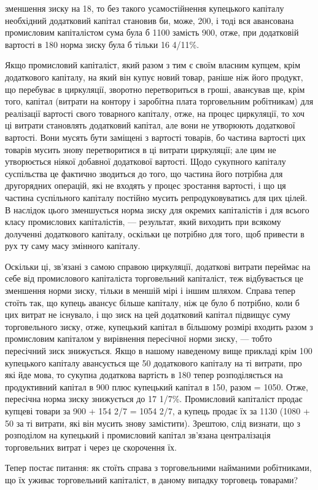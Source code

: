 зменшення зиску на 18, то без такого усамостійнення купецького
капіталу необхідний додатковий капітал становив би, може, 200,
і тоді вся авансована промисловим капіталістом сума була б 1100
замість 900, отже, при додатковій вартості в 180 норма зиску
була б тільки 16 4/11\%.

Якщо промисловий капіталіст, який разом з тим є своїм
власним купцем, крім додаткового капіталу, на який він купує
новий товар, раніше ніж його продукт, що перебуває в циркуляції,
зворотно перетвориться в гроші, авансував ще, крім того,
капітал (витрати на контору і заробітна плата торговельним
робітникам) для реалізації вартості свого товарного капіталу,
отже, на процес циркуляції, то хоч ці витрати становлять
додатковий капітал, але вони не утворюють додаткової вартості.
Вони мусять бути заміщені з вартості товарів, бо частина
вартості цих товарів мусить знову перетворитися в ці витрати
циркуляції; але цим не утворюється ніякої добавної додаткової
вартості. Щодо сукупного капіталу суспільства це фактично
зводиться до того, що частина його потрібна для другорядних
операцій, які не входять у процес зростання вартості, і що ця
частина суспільного капіталу постійно мусить репродуковуватись
для цих цілей. В наслідок цього зменшується норма зиску
для окремих капіталістів і для всього класу промислових капіталістів,
— результат, який виходить при всякому долученні
додаткового капіталу, оскільки це потрібно для того, щоб привести
в рух ту саму масу змінного капіталу.

Оскільки ці, зв’язані з самою справою циркуляції, додаткові
витрати переймає на себе від промислового капіталіста торговельний
капіталіст, теж відбувається це зменшення норми зиску,
тільки в меншій мірі і іншим шляхом. Справа тепер стоїть так,
що купець авансує більше капіталу, ніж це було б потрібно,
коли б цих витрат не існувало, і що зиск на цей додатковий
капітал підвищує суму торговельного зиску, отже, купецький
капітал в більшому розмірі входить разом з промисловим капіталом
у вирівнення пересічної норми зиску, — тобто пересічний
зиск знижується. Якщо в нашому наведеному вище прикладі крім
100 купецького капіталу авансується ще 50 додаткового капіталу
на ті витрати, про які йде мова, то сукупна додаткова
вартість в 180 тепер розподіляється на продуктивний капітал
в 900 плюс купецький капітал в 150, разом = 1050. Отже, пересічна
норма зиску знижується до 17 1/7\%. Промисловий капіталіст
продає купцеві товари за 900 + 154 2/7 = 1054 2/7, а купець
продає їх за 1130 (1080 + 50 за ті витрати, які він мусить знову
замістити). Зрештою, слід визнати, що з розподілом на купецький
і промисловий капітал зв’язана централізація торговельних
витрат і через це скорочення їх.

Тепер постає питання: як стоїть справа з торговельними
найманими робітниками, що їх уживає торговельний капіталіст,
в даному випадку торговець товарами?
